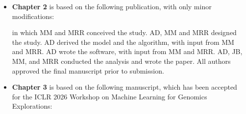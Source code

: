 \documentclass[draft,final]{istaustriathesis}
\begin{document}
\begin{publicationlist}  %
\begin{itemize}
    
    \item \textbf{Chapter 2} is based on the following publication, with only minor modifications:



        \vspace{5pt}   

        in which MM and MRR conceived the study. AD, MM and MRR designed the study. AD derived the model and the algorithm, with input  from MM and MRR. AD wrote the software, with input from MM and MRR. AD, JB, MM, and MRR conducted the analysis and wrote the paper. All authors approved the final manuscript prior to submission. 


    

    \item \textbf{Chapter 3} is based on the following manuscript, which has been accepted for the ICLR 2026 Workshop on Machine Learning for Genomics Explorations:
    

\end{itemize}
\end{publicationlist}
\end{document}
